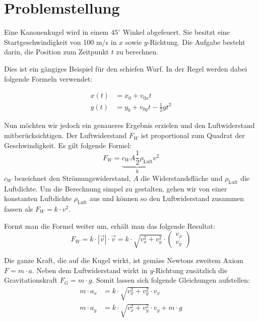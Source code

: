 \section{Problemstellung
\label{perturbation:section:problemstellung}}
Eine Kanonenkugel wird in einem $45^{\circ}$ Winkel abgefeuert. 
Sie besitzt eine Startgeschwindigkeit von 100 m/s in $x$ sowie $y$-Richtung. 
Die Aufgabe besteht darin, die Position zum Zeitpunkt $t$ zu berechnen.

Dies ist ein gängiges Beispiel für den schiefen Wurf. 
In der Regel werden dabei folgende Formeln verwendet:

\begin{equation}\label{eq:x_simple}
\begin{aligned}
    x(t) &= x_0 + v_{0x}t\\
    y(t) &= y_0 + v_{0y}t - \frac{1}{2}gt^2
\end{aligned}
\end{equation}


Nun möchten wir jedoch ein genaueres Ergebnis erzielen und den Luftwiderstand mitberücksichtigen.  
Der Luftwiderstand $F_W$ ist proportional zum Quadrat der Geschwindigkeit. Es gilt folgende Formel:
\[
F_W = \underbrace{c_WA\frac{1}{2}\rho_{\text{Luft}}}_\text{k}v^2
\]
$c_W$ bezeichnet den Strömungswiderstand, $A$ die Widerstandsfläche und $\rho_{\text{Luft}}$ die Luftdichte. 
Um die Berechnung simpel zu gestalten, gehen wir von einer konstanten Luftdichte $\rho_{\text{Luft}}$ aus und können so den Luftwiderstand zusammen fassen als $F_W = k \cdot v^2$.

Formt man die Formel weiter um, erhält man das folgende Resultat:
\[
F_W = k \cdot |\vec{v}| \cdot \vec{v} = k \cdot \sqrt{v_x^2 + v_y^2} \cdot \begin{pmatrix}v_x\\v_y\end{pmatrix}
\]

Die ganze Kraft, die auf die Kugel wirkt, ist gemäss Newtons zweitem Axiom $F = m \cdot a$. 
Neben dem Luftwiderstand wirkt in $y$-Richtung zusätzlich die Gravitationskraft $F_G = m \cdot g$. 
Somit lassen sich folgende Gleichungen aufstellen:
\begin{align*}
m \cdot a_x &= k \cdot \sqrt{v_x^2 + v_y^2} \cdot v_x\\
m \cdot a_y &= k \cdot \sqrt{v_x^2 + v_y^2} \cdot v_y + m \cdot g
\end{align*}

